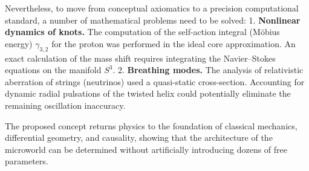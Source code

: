 \documentclass[11pt,a4paper]{article}
\begin{document}
Nevertheless, to move from conceptual axiomatics to a precision computational standard, a number of mathematical problems need to be solved:
1. \textbf{Nonlinear dynamics of knots.} The computation of the self-action integral (Möbius energy) $\gamma_{3,2}$ for the proton was performed in the ideal core approximation. An exact calculation of the mass shift requires integrating the Navier–Stokes equations on the manifold $S^3$.
2. \textbf{Breathing modes.} The analysis of relativistic aberration of strings (neutrinos) used a quasi-static cross-section. Accounting for dynamic radial pulsations of the twisted helix could potentially eliminate the remaining oscillation inaccuracy.

The proposed concept returns physics to the foundation of classical mechanics, differential geometry, and causality, showing that the architecture of the microworld can be determined without artificially introducing dozens of free parameters.
\end{document}
